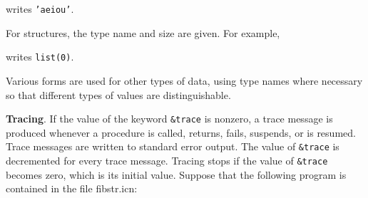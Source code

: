

\noindent writes \texttt{{}'aeiou'}.

For structures, the type name and size are given. For example,



\noindent writes \texttt{list(0)}.

Various forms are used for other types of data, using type names where
necessary so that different types of values are distinguishable.


\textbf{Tracing}. If the value of the keyword \texttt{\&trace} is
nonzero, a trace message is produced whenever a procedure is called,
returns, fails, suspends, or is resumed. Trace messages are written to
standard error output. The value of \texttt{\&trace} is decremented
for every trace message. Tracing stops if the value of
\texttt{\&trace} becomes zero, which is its initial value. Suppose
that the following program is contained in the file fibstr.icn:



